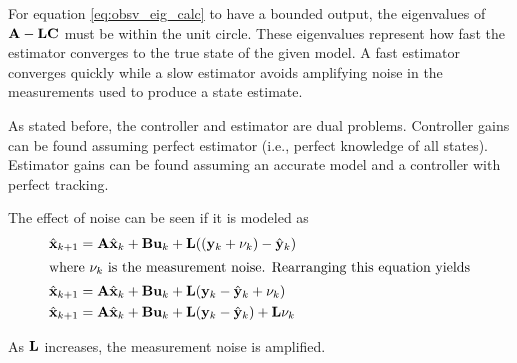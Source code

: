 For equation \eqref{eq:obsv_eig_calc} to have a bounded output, the eigenvalues
of $\mathbf{A} - \mathbf{L}\mathbf{C}$ must be within the unit circle. These eigenvalues
represent how fast the estimator converges to the true \gls{state} of the given
\gls{model}. A fast estimator converges quickly while a slow estimator avoids
amplifying noise in the measurements used to produce a \gls{state} estimate.

As stated before, the controller and estimator are dual problems. Controller
gains can be found assuming perfect estimator (i.e., perfect knowledge of all
\glspl{state}). Estimator gains can be found assuming an accurate \gls{model}
and a controller with perfect \gls{tracking}.

The effect of noise can be seen if it is modeled
 as
\begin{align*}
  \hat{\mathbf{x}}_{k+1} &= \mathbf{A}\hat{\mathbf{x}}_k + \mathbf{B}\mathbf{u}_k +
    \mathbf{L} ((\mathbf{y}_k + \mathbf{\nu}_k) - \hat{\mathbf{y}}_k) \\
  \intertext{where $\mathbf{\nu}_k$ is the measurement noise. Rearranging this
    equation yields}
  \hat{\mathbf{x}}_{k+1} &= \mathbf{A}\hat{\mathbf{x}}_k + \mathbf{B}\mathbf{u}_k +
    \mathbf{L} (\mathbf{y}_k - \hat{\mathbf{y}}_k + \mathbf{\nu}_k) \\
  \hat{\mathbf{x}}_{k+1} &= \mathbf{A}\hat{\mathbf{x}}_k + \mathbf{B}\mathbf{u}_k +
    \mathbf{L} (\mathbf{y}_k - \hat{\mathbf{y}}_k) + \mathbf{L}\mathbf{\nu}_k
\end{align*}

As $\mathbf{L}$ increases, the measurement noise is amplified.
